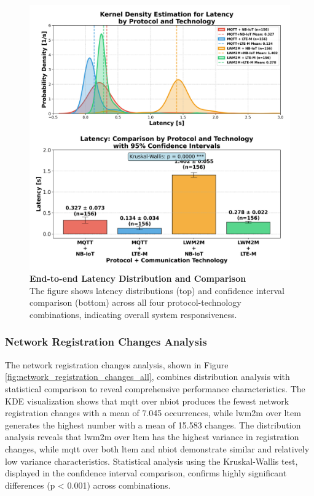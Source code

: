 \documentclass[12pt, english, openany]{book}
\begin{document}
\begin{figure}[htbp]
    \centering
    \includegraphics[width=1.0\textwidth]{latency_all_protocol_tech_kde_ci.png}
    \caption{\textbf{End-to-end Latency Distribution and Comparison} \\ The figure shows latency distributions (top) and confidence interval comparison (bottom) across all four protocol-technology combinations, indicating overall system responsiveness.}
    \label{fig:latency_all}
\end{figure}
\FloatBarrier
\subsubsection*{Network Registration Changes Analysis} \label{sec:network_registration_changes_analysis}

The network registration changes analysis, shown in Figure \ref{fig:network_registration_changes_all}, combines distribution analysis with statistical comparison to reveal comprehensive performance characteristics. The KDE visualization shows that \gls{mqtt} over \gls{nbiot} produces the fewest network registration changes with a mean of 7.045 occurrences, while \gls{lwm2m} over \gls{ltem} generates the highest number with a mean of 15.583 changes. The distribution analysis reveals that \gls{lwm2m} over \gls{ltem} has the highest variance in registration changes, while \gls{mqtt} over both \gls{ltem} and \gls{nbiot} demonstrate similar and relatively low variance characteristics. Statistical analysis using the Kruskal-Wallis test, displayed in the confidence interval comparison, confirms highly significant differences (p < 0.001) across combinations.
\end{document}
